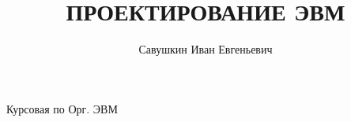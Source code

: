 \newcommand{\resdir}{res}							%

\newcommand{\docauthor}{Савушкин Иван Евгеньевич}
\newcommand{\docauthorshort}{Савушкин\,И.\,Е.}
\newcommand{\docauthormail}{savushkin@niuitmo.ru}
\newcommand{\doctitle}{ПРОЕКТИРОВАНИЕ ЭВМ}
\newcommand{\docsupervisor}{Тропченко\,А.\,А.}
\newcommand{\coursename}{Организация ЭВМ и систем}
\newcommand{\worktype}{Курсовая работа}

\title{\doctitle}
\author{\docauthor}







Курсовая по Орг. ЭВМ

